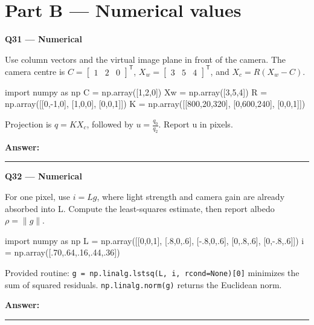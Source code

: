 \documentclass[11pt,a4paper]{article}
\begin{document}
\par\vspace{12pt}
\clearpage\section*{Part B — Numerical values}
\begin{minipage}{\linewidth}
\textbf{Q31 — Numerical}\par\smallskip
Use column vectors and the virtual image plane in front of the camera. The camera centre is \(C=\begin{bmatrix}1&2&0\end{bmatrix}^{\mathsf T}\),\allowbreak{} \(X_w=\begin{bmatrix}3&5&4\end{bmatrix}^{\mathsf T}\),\allowbreak{} and \(X_c=R(X_w-C)\).


\begin{Code}
import numpy as np
C = np.array([1,2,0])
Xw = np.array([3,5,4])
R = np.array([[0,-1,0], [1,0,0], [0,0,1]])
K = np.array([[800,20,320], [0,600,240], [0,0,1]])
\end{Code}


Projection is \(q=KX_c\),\allowbreak{} followed by \(u=\frac{q_0}{q_2}\). Report u in pixels.
\par\medskip\textbf{Answer:} \rule{55mm}{0.4pt}
\end{minipage}
\par\vspace{12pt}
\begin{minipage}{\linewidth}
\textbf{Q32 — Numerical}\par\smallskip
For one pixel,\allowbreak{} use \(i=Lg\),\allowbreak{} where light strength and camera gain are already absorbed into L. Compute the least-squares estimate,\allowbreak{} then report albedo \(\rho=\lVert g\rVert\).


\begin{Code}
import numpy as np
L = np.array([[0,0,1], [.8,0,.6], [-.8,0,.6],
              [0,.8,.6], [0,-.8,.6]])
i = np.array([.70,.64,.16,.44,.36])
\end{Code}


Provided routine: \texttt{g =\allowbreak{} np.linalg.lstsq(L,\allowbreak{} i,\allowbreak{} rcond=\allowbreak{}None)[0]} minimizes the sum of squared residuals. \texttt{np.linalg.norm(g)} returns the Euclidean norm.
\par\medskip\textbf{Answer:} \rule{55mm}{0.4pt}
\end{minipage}
\par\vspace{12pt}
\end{document}
